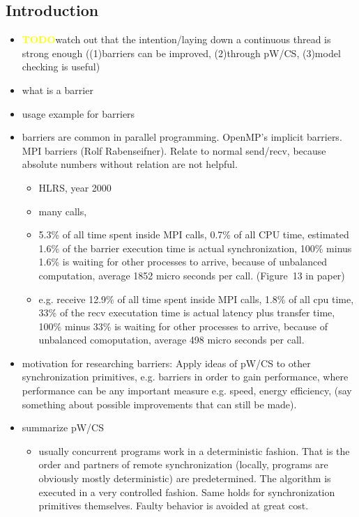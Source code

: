 \documentclass[a4paper, 10pt]{article}
\def \todo{\textbf{\textcolor{yellow}{TODO}}}
\begin{document}
\begin{enumerate}
\section{Introduction}
\label{sec:introduction}
\begin{itemize}
	\item \todo watch out that the intention/laying down a continuous thread is strong enough ((1)barriers can be improved, (2)through pW/CS, (3)model checking is useful)
	\item what is a barrier
	\item usage example for barriers
	\item barriers are common in parallel programming. OpenMP's\cite{openmp} implicit barriers. MPI barriers (Rolf Rabenseifner\cite{rab00}). Relate to normal send/recv, because absolute numbers without relation are not helpful.
		\begin{itemize}
			\item HLRS, year 2000
			\item many calls,
			\item 5.3\% of all time spent inside MPI calls, 0.7\% of all CPU time, estimated 1.6\% of the barrier execution time is actual synchronization, 100\% minus 1.6\% is waiting for other processes to arrive, because of unbalanced computation, average 1852 micro seconds per call. (Figure~13 in paper)
			\item e.g. receive 12.9\% of all time spent inside MPI calls, 1.8\% of all cpu time, 33\% of the recv executation time is actual latency plus transfer time, 100\% minus 33\% is waiting for other processes to arrive, because of unbalanced comoputation, average 498 micro seconds per call.
		\end{itemize}
	\item motivation for researching barriers: Apply ideas of pW/CS\cite{pwcs} to other synchronization primitives, e.g. barriers in order to gain performance, where performance can be any important measure e.g. speed, energy efficiency, (say something about possible improvements that can still be made).
	\item summarize pW/CS
		\begin{itemize}
			\item usually concurrent programs work in a deterministic fashion. That is the order and partners of remote synchronization (locally, programs are obviously mostly deterministic) are predetermined. The algorithm is executed in a very controlled fashion. Same holds for synchronization primitives themselves. Faulty behavior is avoided at great cost.

\end{itemize}
\end{itemize}
\end{enumerate}
\end{document}
